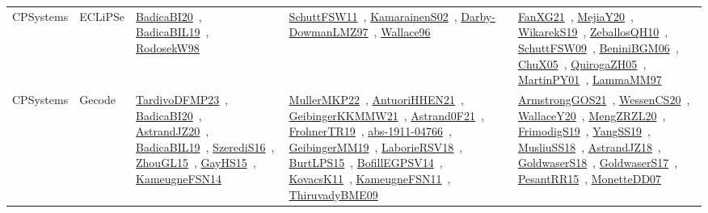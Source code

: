 {\begin{longtable}{lp{3cm}>{\raggedright\arraybackslash}p{6cm}>{\raggedright\arraybackslash}p{6cm}>{\raggedright\arraybackslash}p{8cm}}
CPSystems & ECLiPSe & \href{works/BadicaBI20.pdf}{BadicaBI20}~\cite{BadicaBI20}, \href{works/BadicaBIL19.pdf}{BadicaBIL19}~\cite{BadicaBIL19}, \href{works/RodosekW98.pdf}{RodosekW98}~\cite{RodosekW98} & \href{works/SchuttFSW11.pdf}{SchuttFSW11}~\cite{SchuttFSW11}, \href{works/KamarainenS02.pdf}{KamarainenS02}~\cite{KamarainenS02}, \href{works/Darby-DowmanLMZ97.pdf}{Darby-DowmanLMZ97}~\cite{Darby-DowmanLMZ97}, \href{works/Wallace96.pdf}{Wallace96}~\cite{Wallace96} & \href{works/FanXG21.pdf}{FanXG21}~\cite{FanXG21}, \href{works/MejiaY20.pdf}{MejiaY20}~\cite{MejiaY20}, \href{works/WikarekS19.pdf}{WikarekS19}~\cite{WikarekS19}, \href{works/ZeballosQH10.pdf}{ZeballosQH10}~\cite{ZeballosQH10}, \href{works/SchuttFSW09.pdf}{SchuttFSW09}~\cite{SchuttFSW09}, \href{works/BeniniBGM06.pdf}{BeniniBGM06}~\cite{BeniniBGM06}, \href{works/ChuX05.pdf}{ChuX05}~\cite{ChuX05}, \href{works/QuirogaZH05.pdf}{QuirogaZH05}~\cite{QuirogaZH05}, \href{works/MartinPY01.pdf}{MartinPY01}~\cite{MartinPY01}, \href{works/LammaMM97.pdf}{LammaMM97}~\cite{LammaMM97}\\
CPSystems & Gecode & \href{works/TardivoDFMP23.pdf}{TardivoDFMP23}~\cite{TardivoDFMP23}, \href{works/BadicaBI20.pdf}{BadicaBI20}~\cite{BadicaBI20}, \href{works/AstrandJZ20.pdf}{AstrandJZ20}~\cite{AstrandJZ20}, \href{works/BadicaBIL19.pdf}{BadicaBIL19}~\cite{BadicaBIL19}, \href{works/SzerediS16.pdf}{SzerediS16}~\cite{SzerediS16}, \href{works/ZhouGL15.pdf}{ZhouGL15}~\cite{ZhouGL15}, \href{works/GayHS15.pdf}{GayHS15}~\cite{GayHS15}, \href{works/KameugneFSN14.pdf}{KameugneFSN14}~\cite{KameugneFSN14} & \href{works/MullerMKP22.pdf}{MullerMKP22}~\cite{MullerMKP22}, \href{works/AntuoriHHEN21.pdf}{AntuoriHHEN21}~\cite{AntuoriHHEN21}, \href{works/GeibingerKKMMW21.pdf}{GeibingerKKMMW21}~\cite{GeibingerKKMMW21}, \href{works/Astrand0F21.pdf}{Astrand0F21}~\cite{Astrand0F21}, \href{works/FrohnerTR19.pdf}{FrohnerTR19}~\cite{FrohnerTR19}, \href{works/abs-1911-04766.pdf}{abs-1911-04766}~\cite{abs-1911-04766}, \href{works/GeibingerMM19.pdf}{GeibingerMM19}~\cite{GeibingerMM19}, \href{works/LaborieRSV18.pdf}{LaborieRSV18}~\cite{LaborieRSV18}, \href{works/BurtLPS15.pdf}{BurtLPS15}~\cite{BurtLPS15}, \href{works/BofillEGPSV14.pdf}{BofillEGPSV14}~\cite{BofillEGPSV14}, \href{works/KovacsK11.pdf}{KovacsK11}~\cite{KovacsK11}, \href{works/KameugneFSN11.pdf}{KameugneFSN11}~\cite{KameugneFSN11}, \href{works/ThiruvadyBME09.pdf}{ThiruvadyBME09}~\cite{ThiruvadyBME09} & \href{works/ArmstrongGOS21.pdf}{ArmstrongGOS21}~\cite{ArmstrongGOS21}, \href{works/WessenCS20.pdf}{WessenCS20}~\cite{WessenCS20}, \href{works/WallaceY20.pdf}{WallaceY20}~\cite{WallaceY20}, \href{works/MengZRZL20.pdf}{MengZRZL20}~\cite{MengZRZL20}, \href{works/FrimodigS19.pdf}{FrimodigS19}~\cite{FrimodigS19}, \href{works/YangSS19.pdf}{YangSS19}~\cite{YangSS19}, \href{works/MusliuSS18.pdf}{MusliuSS18}~\cite{MusliuSS18}, \href{works/AstrandJZ18.pdf}{AstrandJZ18}~\cite{AstrandJZ18}, \href{works/GoldwaserS18.pdf}{GoldwaserS18}~\cite{GoldwaserS18}, \href{works/GoldwaserS17.pdf}{GoldwaserS17}~\cite{GoldwaserS17}, \href{works/PesantRR15.pdf}{PesantRR15}~\cite{PesantRR15}, \href{works/MonetteDD07.pdf}{MonetteDD07}~\cite{MonetteDD07}\\

\end{longtable}}
